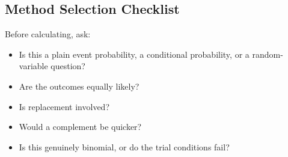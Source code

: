 \subsection{Method Selection Checklist}

Before calculating, ask:
\begin{itemize}[leftmargin=*]
  \item Is this a plain event probability, a conditional probability, or a random-variable question?
  \item Are the outcomes equally likely?
  \item Is replacement involved?
  \item Would a complement be quicker?
  \item Is this genuinely binomial, or do the trial conditions fail?
\end{itemize}

